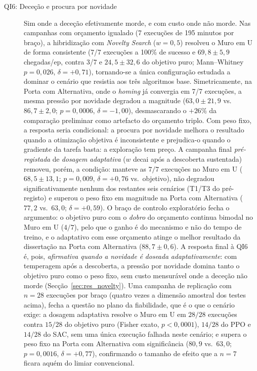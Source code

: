 \documentclass[12pt,reqno, twoside]{amsbook}
\theoremstyle{plain}
\numberwithin{equation}{chapter}
\numberwithin{section}{chapter}
\numberwithin{table}{chapter}
\numberwithin{figure}{chapter}
\begin{document}
\begin{description}
    \item[QI6: Deceção e procura por novidade] Sim onde a deceção efetivamente morde, e com custo onde não morde. Nas campanhas com orçamento igualado (7 execuções de 195 minutos por braço), a hibridização com \textit{Novelty Search} ($w=0{,}5$) resolveu o Muro em U de forma consistente (7/7 execuções a 100\% de sucesso e $69{,}8 \pm 5{,}9$ chegadas/ep, contra 3/7 e $24{,}5 \pm 32{,}6$ do objetivo puro; Mann--Whitney $p=0{,}026$, $\delta=+0{,}71$), tornando-se a única configuração estudada a dominar o cenário que resistia aos três algoritmos base. Simetricamente, na Porta com Alternativa, onde o \textit{homing} já convergia em 7/7 execuções, a mesma pressão por novidade degradou a magnitude ($63{,}0 \pm 21{,}9$ vs.\ $86{,}7 \pm 2{,}0$; $p=0{,}0006$, $\delta=-1{,}00$), desmascarando o $+26\%$ da comparação preliminar como artefacto do orçamento triplo. Com peso fixo, a resposta seria condicional: a procura por novidade melhora o resultado quando a otimização objetiva é inconsistente e prejudica-o quando o gradiente da tarefa basta: a exploração tem preço. A campanha final \emph{pré-registada} de \emph{dosagem adaptativa} ($w$ decai após a descoberta sustentada) removeu, porém, a condição: manteve as $7/7$ execuções no Muro em U ($68{,}5 \pm 13{,}1$; $p=0{,}009$, $\delta=+0{,}76$ vs.\ objetivo), não degradou significativamente nenhum dos restantes seis cenários (T1/T3 do pré-registo) e superou o peso fixo em magnitude na Porta com Alternativa ($77{,}2$ vs.\ $63{,}0$; $\delta=+0{,}59$). O braço de controlo exploratório fecha o argumento: o objetivo puro com o \emph{dobro} do orçamento continua bimodal no Muro em U ($4/7$), pelo que o ganho é do mecanismo e não do tempo de treino, e o adaptativo com esse orçamento atinge o melhor resultado da dissertação na Porta com Alternativa ($88{,}7 \pm 0{,}6$). A resposta final à QI6 é, pois, \emph{afirmativa quando a novidade é doseada adaptativamente}: com temperagem após a descoberta, a pressão por novidade domina tanto o objetivo puro como o peso fixo, sem custo mensurável onde a deceção não morde (Secção~\ref{sec:res_novelty}). Uma campanha de replicação com $n=28$ execuções por braço (quatro vezes a dimensão amostral dos testes acima), fecha a questão no plano da fiabilidade, que é o que o cenário exige: a dosagem adaptativa resolve o Muro em U em $28/28$ execuções contra $15/28$ do objetivo puro (Fisher exato, $p<0{,}0001$), $14/28$ do PPO e $14/28$ do SAC, sem uma única execução falhada neste cenário; e supera o peso fixo na Porta com Alternativa com significância ($80{,}9$ vs.\ $63{,}0$; $p=0{,}0016$, $\delta=+0{,}77$), confirmando o tamanho de efeito que a $n=7$ ficara aquém do limiar convencional.

\end{description}
\end{document}
